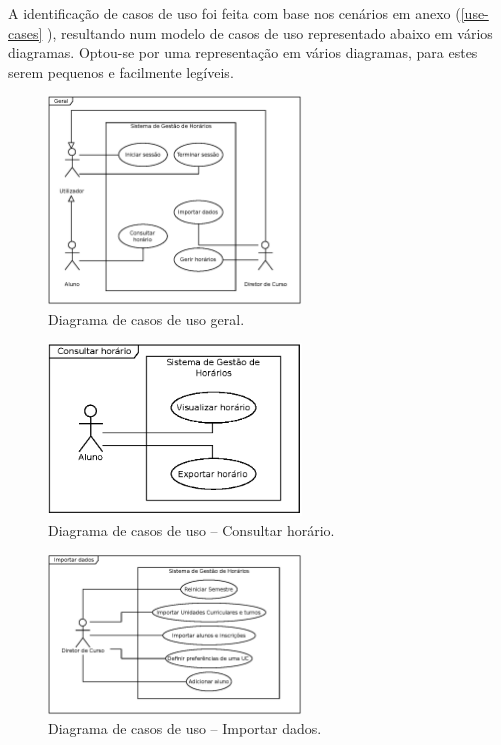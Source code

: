 \documentclass[12pt, a4paper]{article}
\begin{document}
A identificação de casos de uso foi feita com base nos cenários em anexo
(\ref{use-cases} ), resultando num modelo de casos de uso representado abaixo em
vários diagramas. Optou-se por uma representação em vários diagramas, para estes serem pequenos e
facilmente legíveis.

\begin{figure}[H]
    \centering
    \includegraphics[width=0.6\textwidth]{Imagens/Modelos/UseCasesGeral.eps}
    \caption{Diagrama de casos de uso geral.}
\end{figure}

\begin{figure}[H]
    \centering
    \includegraphics[width=0.6\textwidth]{Imagens/Modelos/UseCasesConsultarHorario.eps}
    \caption{Diagrama de casos de uso -- Consultar horário.}
\end{figure}

\begin{figure}[H]
    \centering
    \includegraphics[width=0.6\textwidth]{Imagens/Modelos/UseCasesImportarDados.eps}
    \caption{Diagrama de casos de uso -- Importar dados.}
\end{figure}
\end{document}
